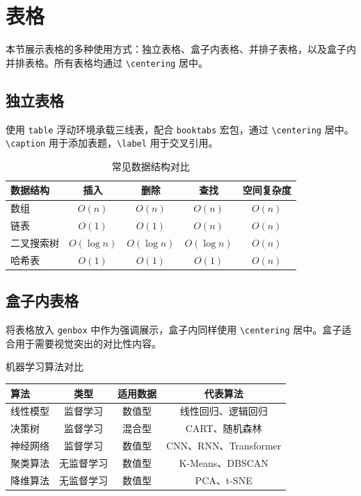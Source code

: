\section{表格}

本节展示表格的多种使用方式：独立表格、盒子内表格、并排子表格，以及盒子内并排表格。所有表格均通过 \texttt{\textbackslash centering} 居中。

\subsection{独立表格}

使用 \texttt{table} 浮动环境承载三线表，配合 \texttt{booktabs} 宏包，通过 \texttt{\textbackslash centering} 居中。\texttt{\textbackslash caption} 用于添加表题，\texttt{\textbackslash label} 用于交叉引用。

\begin{table}[htbp]
\centering
\caption{常见数据结构对比}
\label{tab:data_structures}
\begin{tabular}{@{}lcccc@{}}
\toprule
数据结构 & 插入 & 删除 & 查找 & 空间复杂度 \\
\midrule
数组 & \( O(n) \) & \( O(n) \) & \( O(n) \) & \( O(n) \) \\
链表 & \( O(1) \) & \( O(1) \) & \( O(n) \) & \( O(n) \) \\
二叉搜索树 & \( O(\log n) \) & \( O(\log n) \) & \( O(\log n) \) & \( O(n) \) \\
哈希表 & \( O(1) \) & \( O(1) \) & \( O(1) \) & \( O(n) \) \\
\bottomrule
\end{tabular}
\end{table}

\subsection{盒子内表格}

将表格放入 \texttt{genbox} 中作为强调展示，盒子内同样使用 \texttt{\textbackslash centering} 居中。盒子适合用于需要视觉突出的对比性内容。

\begin{genbox}{机器学习算法对比}
\centering
\begin{tabular}{@{}lccc@{}}
\toprule
算法 & 类型 & 适用数据 & 代表算法 \\
\midrule
线性模型 & 监督学习 & 数值型 & 线性回归、逻辑回归 \\
决策树 & 监督学习 & 混合型 & CART、随机森林 \\
神经网络 & 监督学习 & 数值型 & CNN、RNN、Transformer \\
聚类算法 & 无监督学习 & 数值型 & K-Means、DBSCAN \\
降维算法 & 无监督学习 & 数值型 & PCA、t-SNE \\
\bottomrule
\end{tabular}
\end{genbox}


